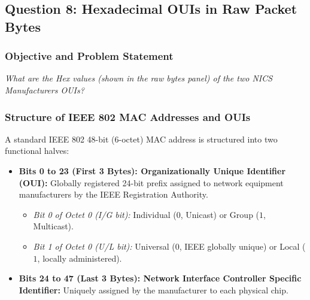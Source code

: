\documentclass[12pt, a4paper]{article}
\begin{document}
\subsection{Question 8: Hexadecimal OUIs in Raw Packet Bytes}

\subsubsection{Objective and Problem Statement}
\textit{What are the Hex values (shown in the raw bytes panel) of the two NICS Manufacturers OUIs?}

\subsubsection{Structure of IEEE 802 MAC Addresses and OUIs}
A standard IEEE 802 48-bit (6-octet) MAC address is structured into two functional halves:
\begin{itemize}
    \item \textbf{Bits 0 to 23 (First 3 Bytes): Organizationally Unique Identifier (OUI):} Globally registered 24-bit prefix assigned to network equipment manufacturers by the IEEE Registration Authority.
    \begin{itemize}
        \item \textit{Bit 0 of Octet 0 (I/G bit):} Individual ($0$, Unicast) or Group ($1$, Multicast).
        \item \textit{Bit 1 of Octet 0 (U/L bit):} Universal ($0$, IEEE globally unique) or Local ($1$, locally administered).
    \end{itemize}
    \item \textbf{Bits 24 to 47 (Last 3 Bytes): Network Interface Controller Specific Identifier:} Uniquely assigned by the manufacturer to each physical chip.
\end{itemize}
\end{document}
